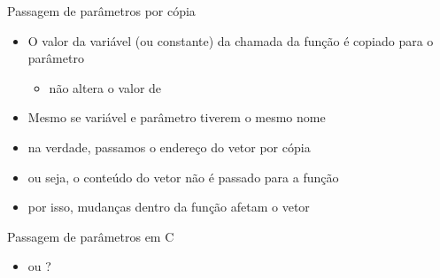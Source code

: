 \documentclass{beamer}
\begin{document}
\begin{frame}[<+->]{Passagem de parâmetros por cópia}
  \begin{itemize}
    \item O valor da variável (ou constante) da chamada da função é \alert{copiado} para o parâmetro
      \begin{itemize}
        \item \alert{} não altera o valor de \alert{}
      \end{itemize}
    \item Mesmo se variável e parâmetro tiverem o mesmo nome
  \end{itemize}

  \bigskip

  \action{}

  \medskip

  \begin{itemize}
    \item na verdade, passamos o endereço do vetor por cópia
    \item ou seja, o conteúdo do vetor não é passado para a função
    \item por isso, mudanças dentro da função afetam o vetor
  \end{itemize}

  \medskip

\end{frame}

\begin{frame}[<+->]{Passagem de parâmetros em C}
  \action{}

  \bigskip

  \begin{itemize}
    \item \alert{} ou \alert{}?
  \end{itemize}
\end{frame}
\end{document}
